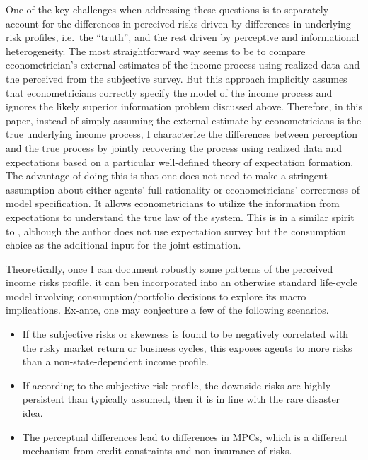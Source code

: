\documentclass[12pt,notitlepage,onecolumn,aps,pra]{article}
\begin{document}
One of the key challenges when addressing these questions is to
separately account for the differences in perceived risks driven by
differences in underlying risk profiles, i.e.~the ``truth'', and the
rest driven by perceptive and informational heterogeneity. The most
straightforward way seems to be to compare econometrician's external
estimates of the income process using realized data and the perceived
from the subjective survey. But this approach implicitly assumes that
econometricians correctly specify the model of the income process and
ignores the likely superior information problem discussed above.
Therefore, in this paper, instead of simply assuming the external
estimate by econometricians is the true underlying income process, I
characterize the differences between perception and the true process by
jointly recovering the process using realized data and expectations
based on a particular well-defined theory of expectation formation. The
advantage of doing this is that one does not need to make a stringent
assumption about either agents' full rationality or econometricians'
correctness of model specification. It allows econometricians to utilize
the information from expectations to understand the true law of the
system. This is in a similar spirit to \cite{guvenen_inferring_2014},
although the author does not use expectation survey but the consumption
choice as the additional input for the joint estimation.

Theoretically, once I can document robustly some patterns of the
perceived income risks profile, it can ben incorporated into an
otherwise standard life-cycle model involving consumption/portfolio
decisions to explore its macro implications. Ex-ante, one may conjecture
a few of the following scenarios.

\begin{itemize}
\item
  If the subjective risks or skewness is found to be negatively
  correlated with the risky market return or business cycles, this
  exposes agents to more risks than a non-state-dependent income
  profile.
\item
  If according to the subjective risk profile, the downside risks are
  highly persistent than typically assumed, then it is in line with the
  rare disaster idea.
\item
  The perceptual differences lead to differences in MPCs, which is a
  different mechanism from credit-constraints and non-insurance of
  risks.
\end{itemize}
\end{document}
